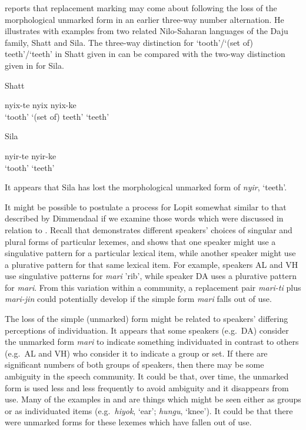 \documentclass[output=paper]{langsci/langscibook}
\begin{document}
\citet[242]{Dimmendaal2000} reports that replacement marking may come about following the loss of the morphological unmarked form in an earlier three-way number alternation. He illustrates with examples from two related Nilo-Saharan languages of the Daju family, Shatt and Sila. The three-way distinction for ‘tooth’/‘(set of) teeth’/‘teeth’ in Shatt given in  can be compared with the two-way distinction given in  for Sila.

\ea\label{ex:moodie:4}
Shatt \citep[242]{Dimmendaal2000}

\gll nyix-te nyix nyix-ke \\
‘tooth’ {‘(set of) teeth’} ‘teeth’ \\
\z

\ea\label{ex:moodie:5}
Sila \citep[243]{Dimmendaal2000}

\gll nyir-te nyir-ke \\
‘tooth’ ‘teeth’ \\
\z

It appears that Sila has lost the morphological unmarked form of \textit{nyir}, ‘teeth’. 

It might be possible to postulate a process for Lopit somewhat similar to that described by Dimmendaal if we examine those words which were discussed in relation to . Recall that  demonstrates different speakers’ choices of singular and plural forms of particular lexemes, and shows that one speaker might use a singulative pattern for a particular lexical item, while another speaker might use a plurative pattern for that same lexical item. For example, speakers AL and VH use singulative patterns for \textit{mari} 'rib', while speaker DA uses a plurative pattern for \textit{mari}. From this variation within a community, a replacement pair \textit{mari-ti} plus \textit{mari-jin} could potentially develop if the simple form \textit{mari} falls out of use. 

The loss of the simple (unmarked) form might be related to speakers’ differing perceptions of individuation. It appears that some speakers (e.g.\ DA) consider the unmarked form \textit{mari }to indicate something individuated in contrast to others (e.g.\ AL and VH) who consider it to indicate a group or set. If there are significant numbers of both groups of speakers, then there may be some ambiguity in the speech community. It could be that, over time, the unmarked form is used less and less frequently to avoid ambiguity and it disappears from use. Many of the examples in  and  are things which might be seen either as groups or as individuated items (e.g.\ \textit{hiyok}, ‘ear’; \textit{hungu}, ‘knee’). It could be that there were unmarked forms for these lexemes which have fallen out of use.
\end{document}
